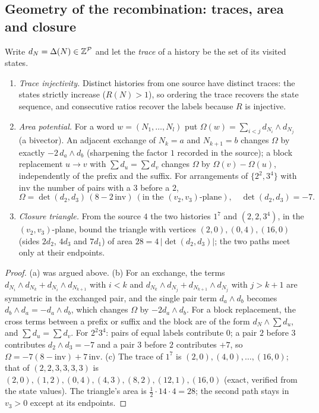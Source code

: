 \subsection{Geometry of the recombination: traces, area and closure}
Write $d_N=\Delta(N)\in\mathbb Z^{\mathcal P}$ and let the \emph{trace} of a history be the set of its visited states.
\begin{theorem}\label{thm:trace}
\begin{enumerate}[label=(\alph*)]
\item \emph{Trace injectivity.} Distinct histories from one source have distinct traces: the states strictly increase ($R(N)>1$), so ordering the trace recovers the state sequence, and consecutive ratios recover the labels because $R$ is injective.
\item \emph{Area potential.} For a word $w=(N_1,\dots,N_l)$ put $\Omega(w)=\sum_{i<j}d_{N_i}\wedge d_{N_j}$ (a bivector). An adjacent exchange of $N_k=a$ and $N_{k+1}=b$ changes $\Omega$ by exactly $-2\,d_a\wedge d_b$ (sharpening the factor $1$ recorded in the source); a block replacement $u\to v$ with $\sum d_u=\sum d_v$ changes $\Omega$ by $\Omega(v)-\Omega(u)$, independently of the prefix and the suffix. For arrangements of $\{2^2,3^4\}$ with $\mathrm{inv}$ the number of pairs with a $3$ before a $2$,
\[\Omega=\det(d_2,d_3)\,(8-2\,\mathrm{inv})\ (\text{in the }(v_2,v_3)\text{-plane}),\quad\det(d_2,d_3)=-7.\]
\item \emph{Closure triangle.} From the source $4$ the two histories $1^7$ and $(2,2,3^4)$, in the $(v_2,v_3)$-plane, bound the triangle with vertices $(2,0),(0,4),(16,0)$ (sides $2d_2$, $4d_3$ and $7d_1$) of area $28=4\,|\det(d_2,d_3)|$; the two paths meet only at their endpoints.
\end{enumerate}
\end{theorem}
\begin{proof}
(a) was argued above. (b) For an exchange, the terms $d_{N_i}\wedge d_{N_k}+d_{N_i}\wedge d_{N_{k+1}}$ with $i<k$ and $d_{N_k}\wedge d_{N_j}+d_{N_{k+1}}\wedge d_{N_j}$ with $j>k+1$ are symmetric in the exchanged pair, and the single pair term $d_a\wedge d_b$ becomes $d_b\wedge d_a=-d_a\wedge d_b$, which changes $\Omega$ by $-2d_a\wedge d_b$. For a block replacement, the cross terms between a prefix or suffix and the block are of the form $d_{N}\wedge\sum d_u$, and $\sum d_u=\sum d_v$. For $2^2 3^4$: pairs of equal labels contribute $0$; a pair $2$ before $3$ contributes $d_2\wedge d_3=-7$ and a pair $3$ before $2$ contributes $+7$, so $\Omega=-7(8-\mathrm{inv})+7\,\mathrm{inv}$. (c) The trace of $1^7$ is $(2,0),(4,0),\dots,(16,0)$; that of $(2,2,3,3,3,3)$ is $(2,0),(1,2),(0,4),(4,3),(8,2),(12,1),(16,0)$ (exact, verified from the state values). The triangle's area is $\frac12\cdot14\cdot4=28$; the second path stays in $v_3>0$ except at its endpoints.
\end{proof}
